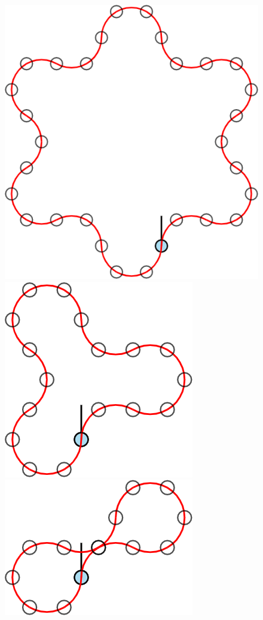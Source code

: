\documentclass{article}
\begin{document}
\begin{figure}[ht!]
  \includegraphics[scale=0.12]{assets/robot_walks/079_problem_6-robot_2_3.png}
  \includegraphics[scale=0.12]{assets/robot_walks/079_problem_6-robot_2_4.png}
  \includegraphics[scale=0.12]{assets/robot_walks/079_problem_6-robot_2_5.png}

\end{figure}
\end{document}

